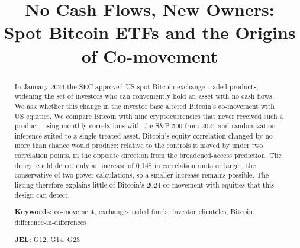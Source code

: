 \title{No Cash Flows, New Owners:\\ Spot Bitcoin ETFs and the Origins of Co-movement}

\begin{abstract}
\noindent In January 2024 the SEC approved US spot Bitcoin exchange-traded products, widening the set of investors who can conveniently hold an asset with no cash flows. We ask whether this change in the investor base altered Bitcoin's co-movement with US equities. We compare Bitcoin with nine cryptocurrencies that never received such a product, using monthly correlations with the S\&P 500 from 2021 and randomization inference suited to a single treated asset. Bitcoin's equity correlation changed by no more than chance would produce: relative to the controls it moved by under two correlation points, in the opposite direction from the broadened-access prediction.
The design could detect only an increase of 0.148 in correlation units or larger, the conservative of two power calculations, so a smaller increase remains possible.
The listing therefore explains little of Bitcoin's 2024 co-movement with equities that this design can detect.

\medskip
\noindent\textbf{Keywords:} co-movement, exchange-traded funds, investor clienteles, Bitcoin, difference-in-differences

\noindent\textbf{JEL:} G12, G14, G23
\end{abstract}
